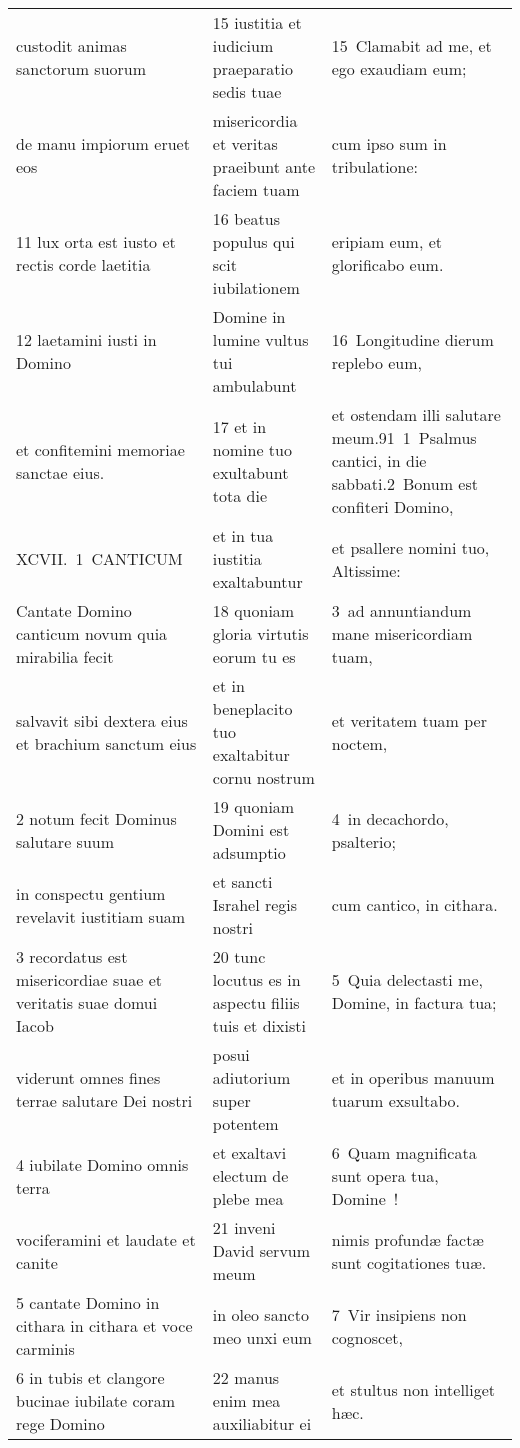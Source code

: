 \documentclass{article}
\begin{document}
\begin{longtable}{@{}p{}p{}p{}@{}}
custodit animas sanctorum suorum	&	15 iustitia et iudicium praeparatio sedis tuae	&	15 Clamabit ad me, et ego exaudiam eum;	\\
de manu impiorum eruet eos	&	misericordia et veritas praeibunt ante faciem tuam	&	cum ipso sum in tribulatione:	\\
11 lux orta est iusto et rectis corde laetitia	&	16 beatus populus qui scit iubilationem	&	eripiam eum, et glorificabo eum.	\\
12 laetamini iusti in Domino	&	Domine in lumine vultus tui ambulabunt	&	16 Longitudine dierum replebo eum,	\\
et confitemini memoriae sanctae eius.	&	17 et in nomine tuo exultabunt tota die	&	et ostendam illi salutare meum.91 1 Psalmus cantici, in die sabbati.2 Bonum est confiteri Domino,	\\
XCVII. 1 CANTICUM	&	et in tua iustitia exaltabuntur	&	et psallere nomini tuo, Altissime:	\\
Cantate Domino canticum novum quia mirabilia fecit	&	18 quoniam gloria virtutis eorum tu es	&	3 ad annuntiandum mane misericordiam tuam,	\\
salvavit sibi dextera eius et brachium sanctum eius	&	et in beneplacito tuo exaltabitur cornu nostrum	&	et veritatem tuam per noctem,	\\
2 notum fecit Dominus salutare suum	&	19 quoniam Domini est adsumptio	&	4 in decachordo, psalterio;	\\
in conspectu gentium revelavit iustitiam suam	&	et sancti Israhel regis nostri	&	cum cantico, in cithara.	\\
3 recordatus est misericordiae suae et veritatis suae domui Iacob	&	20 tunc locutus es in aspectu filiis tuis et dixisti	&	5 Quia delectasti me, Domine, in factura tua;	\\
viderunt omnes fines terrae salutare Dei nostri	&	posui adiutorium super potentem	&	et in operibus manuum tuarum exsultabo.	\\
4 iubilate Domino omnis terra	&	et exaltavi electum de plebe mea	&	6 Quam magnificata sunt opera tua, Domine !	\\
vociferamini et laudate et canite	&	21 inveni David servum meum	&	nimis profundæ factæ sunt cogitationes tuæ.	\\
5 cantate Domino in cithara in cithara et voce carminis	&	in oleo sancto meo unxi eum	&	7 Vir insipiens non cognoscet,	\\
6 in tubis et clangore bucinae iubilate coram rege Domino	&	22 manus enim mea auxiliabitur ei	&	et stultus non intelliget hæc.	\\

\end{longtable}
\end{document}
